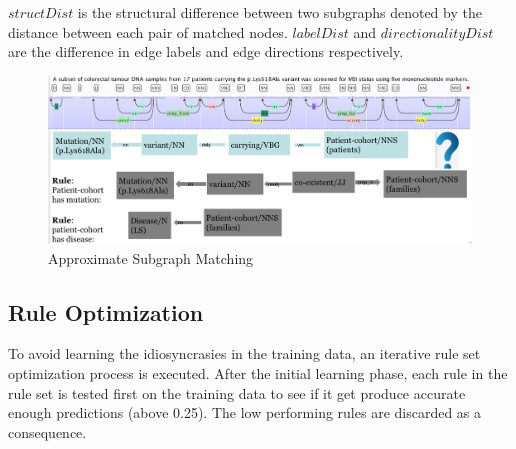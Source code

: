 $structDist$ is the structural difference between two subgraphs denoted by the distance between each pair of matched nodes. $labelDist$ and $directionalityDist$ are the difference in edge labels and edge directions respectively\cite{liu2013approximate}.
\begin{figure}[h]
	\centering
	\includegraphics[width=\textwidth]{ASM}
	\caption{Approximate Subgraph Matching}
	\label{fig:ASM}   
\end{figure}
\subsection{Rule Optimization}
To avoid learning the idiosyncrasies in the training data, an iterative rule set optimization process is executed. After the initial learning phase, each rule in the rule set is tested first on the training data to see if it get produce accurate enough predictions (above 0.25). The low performing rules are discarded as a consequence.   
